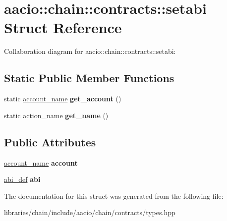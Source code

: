 \hypertarget{structaacio_1_1chain_1_1contracts_1_1setabi}{}\section{aacio\+:\+:chain\+:\+:contracts\+:\+:setabi Struct Reference}
\label{structaacio_1_1chain_1_1contracts_1_1setabi}


Collaboration diagram for aacio\+:\+:chain\+:\+:contracts\+:\+:setabi\+:
\subsection*{Static Public Member Functions}
\begin{DoxyCompactItemize}
\item 
\mbox{\label{structaacio_1_1chain_1_1contracts_1_1setabi_a31fefcc40c3e1479edd7e5aa2dce3ccc}} 
static \mbox{\hyperlink{structaacio_1_1chain_1_1name}{account\+\_\+name}} {\bfseries get\+\_\+account} ()
\item 
\mbox{\label{structaacio_1_1chain_1_1contracts_1_1setabi_a2e8578425e9fe40f97394ba2c3aff8d6}} 
static action\+\_\+name {\bfseries get\+\_\+name} ()
\end{DoxyCompactItemize}
\subsection*{Public Attributes}
\begin{DoxyCompactItemize}
\item 
\mbox{\label{structaacio_1_1chain_1_1contracts_1_1setabi_a81a769cf216f9fa6a20c49f399f02cfa}} 
\mbox{\hyperlink{structaacio_1_1chain_1_1name}{account\+\_\+name}} {\bfseries account}
\item 
\mbox{\label{structaacio_1_1chain_1_1contracts_1_1setabi_ab4232240d5d234d21cbc0385b76108af}} 
\mbox{\hyperlink{structaacio_1_1chain_1_1contracts_1_1abi__def}{abi\+\_\+def}} {\bfseries abi}
\end{DoxyCompactItemize}


The documentation for this struct was generated from the following file\+:\begin{DoxyCompactItemize}
\item 
libraries/chain/include/aacio/chain/contracts/types.\+hpp\end{DoxyCompactItemize}
